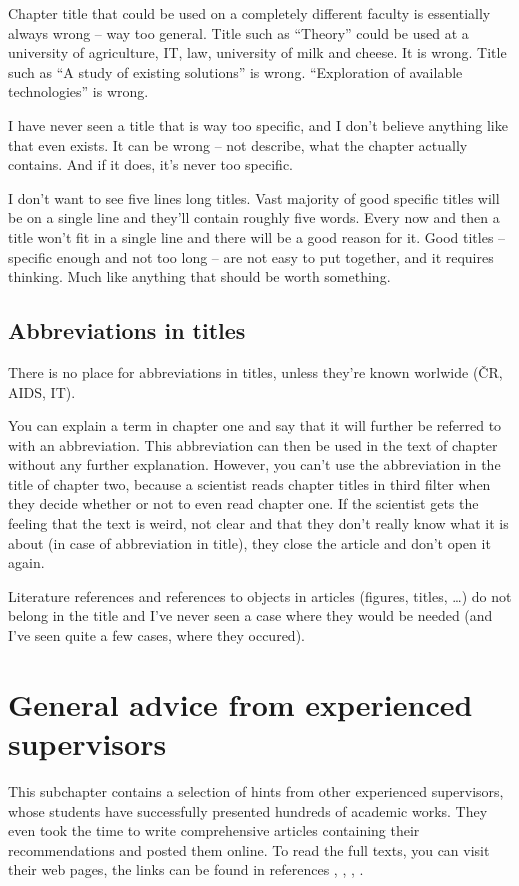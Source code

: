 {{Chapter title that could be used on a completely different faculty is essentially always wrong -- way too general. Title such as ``Theory'' could be used at a university of agriculture, IT, law, university of milk and cheese. It is wrong. Title such as ``A study of existing solutions'' is wrong. ``Exploration of available technologies'' is wrong.

I have never seen a title that is way too specific, and I don't believe anything like that even exists. It can be wrong -- not describe, what the chapter actually contains. And if it does, it's never too specific.

I don't want to see five lines long titles. Vast majority of good specific titles will be on a single line and they'll contain roughly five words. Every now and then a title won't fit in a single line and there will be a good reason for it. Good titles -- specific enough and not too long -- are not easy to put together, and it requires thinking. Much like anything that should be worth something.


\subsection*{Abbreviations in titles}

There is no place for abbreviations in titles, unless they're known worlwide (ČR, AIDS, IT).

You can explain a term in chapter one and say that it will further be referred to with an abbreviation. This abbreviation can then be used in the text of chapter without any further explanation. However, you can't use the abbreviation in the title of chapter two, because a scientist reads chapter titles in third filter when they decide whether or not to even read chapter one. If the scientist gets the feeling that the text is weird, not clear and that they don't really know what it is about (in case of abbreviation in title), they close the article and don't open it again.

Literature references and references to objects in articles (figures, titles, \ldots) do not belong in the title and I've never seen a case where they would be needed (and I've seen quite a few cases, where they occured).


\section{General advice from experienced supervisors}

This subchapter contains a selection of hints from other experienced supervisors, whose students have successfully presented hundreds of academic works. They even took the time to write comprehensive articles containing their recommendations and posted them online. To read the full texts, you can visit their web pages, the links can be found in references \cite{Beran}, \cite{BeranPDF}, \cite{Cernocky}, \cite{Zemcik}.

}}
